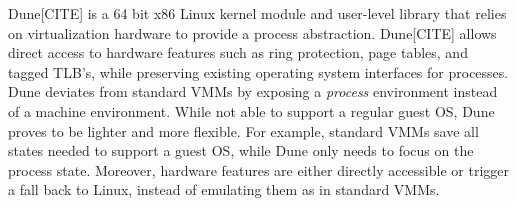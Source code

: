 Dune[CITE] is a 64 bit x86 Linux kernel module and user-level library that relies on virtualization hardware to provide a process abstraction.
Dune[CITE] allows direct access to hardware features such as ring protection, page tables, and tagged TLB's, while preserving existing operating system interfaces for processes.
Dune deviates from standard VMMs by exposing a \textit{process} environment instead of a machine environment.
While not able to support a regular guest OS, Dune proves to be lighter and more flexible.
For example, standard VMMs save all states needed to support a guest OS, while Dune only needs to focus on the process state.
Moreover, hardware features are either directly accessible or trigger a fall back to Linux, instead of emulating them as in standard VMMs.